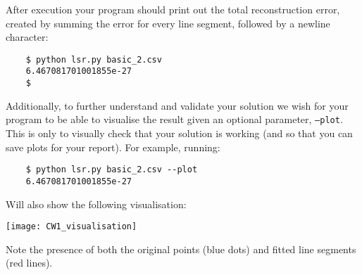 \documentclass[10pt]{article}
\begin{document}
After execution your program should print out the total reconstruction error, created by summing the error for every line segment, followed by a newline character:

\begin{verbatim}
    $ python lsr.py basic_2.csv
    6.467081701001855e-27
    $
\end{verbatim}

Additionally, to further understand and validate your solution we wish for your program to be able to visualise the result given an optional parameter, \texttt{--plot}.
This is only to visually check that your solution is working (and so that you can save plots for your report).
For example, running:

\begin{verbatim}
    $ python lsr.py basic_2.csv --plot
    6.467081701001855e-27
\end{verbatim}

Will also show the following visualisation:

\texttt{[image: CW1\_visualisation]}

Note the presence of both the original points (blue dots) and fitted line segments (red lines).
\end{document}

